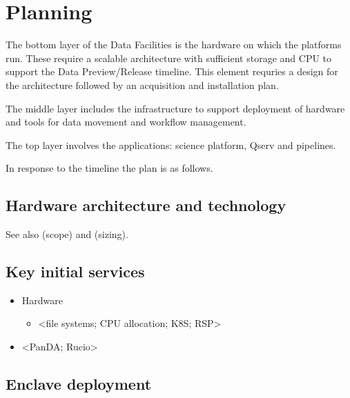 \section{Planning}\label{sec:plan}

The bottom layer of the Data Facilities is the hardware on which the
platforms run. These require a scalable architecture with sufficient
storage and CPU to support the Data Preview/Release timeline.  This
element requries a design for the architecture followed by an
acquisition and installation plan.

The middle layer includes the infrastructure to support deployment of
hardware and tools for data movement and workflow management.

 The top layer involves the applications: science platform, Qserv and pipelines.

In response to the timeline  the plan is as follows.

\subsection {Hardware architecture and technology}
See also  (scope) and   (sizing).

\subsection{Key initial services}

\begin{itemize}
  \item Hardware
  \begin{itemize}
  \item <file systems; CPU allocation; K8S; \gls{RSP}>
  \end{itemize}
\item <PanDA; Rucio>

\end{itemize}

\subsection {Enclave deployment}
